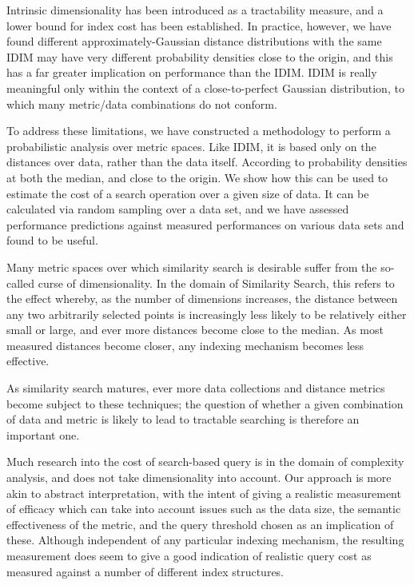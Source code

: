 Intrinsic dimensionality has been introduced as a tractability measure\cite{}, and a lower bound for index cost has been established. In practice, however, we have found different approximately-Gaussian distance distributions with the same IDIM may have very different probability densities close to the origin, and this has a far greater implication on performance than the IDIM. IDIM is really meaningful only within the context of a close-to-perfect Gaussian distribution, to which many metric/data combinations do not conform.

To address these limitations, we have constructed a methodology to perform a probabilistic analysis over metric spaces. Like IDIM, it is based
only on the distances over data, rather than the data itself. According to probability densities at both the median, and close to the origin. We show how this can be used to estimate the cost of a search operation over a given size of data.  It can be calculated via random sampling over a data set, and we have assessed performance predictions against measured performances on various data sets and found to be useful.

Many metric spaces over which similarity search is desirable suffer from the so-called curse of dimensionality. In the domain of Similarity Search, this refers to the effect whereby, as the number of dimensions increases, the distance between any two arbitrarily selected points is increasingly less likely to be relatively either small or large, and ever more distances become close to the median. As most measured distances become closer, any indexing mechanism becomes less effective.

As similarity search matures, ever more data collections and distance metrics become subject to these techniques; the question of whether a given combination of data and metric is likely to lead to tractable searching is therefore an important one.

Much research into the cost of search-based query is in the domain of complexity analysis, and does not take dimensionality into account. Our approach is more akin to abstract interpretation, with the intent of giving a realistic measurement of efficacy which can take into account issues such as the data size, the semantic effectiveness of the metric, and the query threshold chosen as an implication of these. Although independent of any particular indexing mechanism, the resulting measurement does seem to give a good indication of realistic query cost as measured against a number of different index structures.

